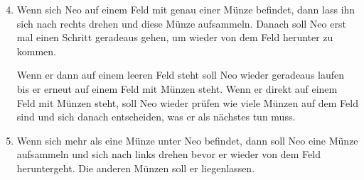 \begin{enumerate}\setcounter{enumi}{3}
	\item
		Wenn sich Neo auf einem Feld mit genau einer Münze befindet, dann lass ihn sich nach rechts drehen und diese Münze aufsammeln. 
		Danach soll Neo erst mal einen Schritt geradeaus gehen, um wieder von dem Feld herunter zu kommen.

		Wenn er dann auf einem leeren Feld steht soll Neo wieder geradeaus laufen bis er erneut auf einem Feld mit Münzen steht.
		Wenn er direkt auf einem Feld mit Münzen steht, soll Neo wieder prüfen wie viele Münzen auf dem Feld sind und sich danach entscheiden, was er als nächstes tun muss.

	\item
		Wenn sich mehr als eine Münze unter Neo befindet, dann soll Neo eine Münze aufsammeln und sich nach links drehen bevor er wieder von dem Feld heruntergeht.
		Die anderen Münzen soll er liegenlassen.
\end{enumerate}



